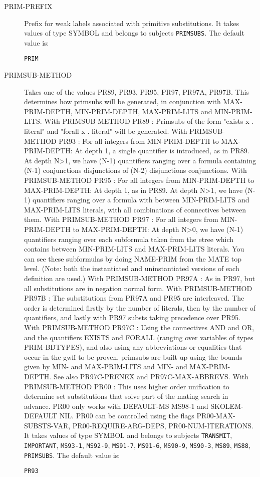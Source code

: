\begin{description}
\item[PRIM-PREFIX]  
Prefix for weak labels associated with primitive substitutions.
It takes values of type SYMBOL and belongs to subjects \texttt{PRIMSUBS}.  The default value is: \begin{lstlisting}
PRIM
\end{lstlisting}

\item[PRIMSUB-METHOD]  
Takes one of the values PR89, PR93, PR95, PR97, PR97A, PR97B.
This determines how primsubs will be generated, in 
conjunction with MAX-PRIM-DEPTH, MIN-PRIM-DEPTH, 
MAX-PRIM-LITS and MIN-PRIM-LITS.
With PRIMSUB-METHOD PR89 : 
 Primsubs of the form "exists x . literal" and 
 "forall x . literal" will be generated.
With PRIMSUB-METHOD PR93 :
 For all integers from MIN-PRIM-DEPTH to MAX-PRIM-DEPTH:
  At depth 1, a single quantifier is introduced, as in PR89. 
  At depth N>1, we have (N-1) quantifiers ranging over a formula
  containing (N-1) conjunctions {disjunctions} of (N-2) 
  disjunctions {conjunctions}.
With PRIMSUB-METHOD PR95 :
 For all integers from MIN-PRIM-DEPTH to MAX-PRIM-DEPTH:
  At depth 1, as in PR89.
  At depth N>1, we have (N-1) quantifiers ranging over a formula
  with between MIN-PRIM-LITS and MAX-PRIM-LITS literals, with
  all combinations of connectives between them.
With PRIMSUB-METHOD PR97 :
 For all integers from MIN-PRIM-DEPTH to MAX-PRIM-DEPTH:
  At depth N>0, we have (N-1) quantifiers ranging over each 
  subformula taken from the etree which contains between 
  MIN-PRIM-LITS and MAX-PRIM-LITS literals. You can see these
 subformulas by doing NAME-PRIM from the MATE top level. (Note:
 both the instantiated and uninstantiated versions of each 
 definition are used.)
With PRIMSUB-METHOD PR97A :
 As in PR97, but all substitutions are in negation normal form.
With PRIMSUB-METHOD PR97B :
 The substitutions from PR97A and PR95 are interleaved. The order
 is determined firstly by the number of literals, then by the number of
 quantifiers, and lastly with PR97 substs taking precedence over PR95.
With PRIMSUB-METHOD PR97C :
 Using the connectives AND and OR, and the quantifiers EXISTS and
 FORALL (ranging over variables of types PRIM-BDTYPES), and also using
 any abbreviations or equalities that occur in the gwff to be proven, 
 primsubs are built up using the bounds given by MIN- and MAX-PRIM-LITS
 and MIN- and MAX-PRIM-DEPTH. See also PR97C-PRENEX and PR97C-MAX-ABBREVS.
With PRIMSUB-METHOD PR00  :
 This uses higher order unification to determine set substitutions
 that solve part of the mating search in advance.  PR00 only works with 
 DEFAULT-MS MS98-1 and SKOLEM-DEFAULT NIL. PR00 can be controlled using the flags
 PR00-MAX-SUBSTS-VAR, PR00-REQUIRE-ARG-DEPS, PR00-NUM-ITERATIONS.
It takes values of type SYMBOL and belongs to subjects \texttt{TRANSMIT}, \texttt{IMPORTANT}, \texttt{MS93-1}, \texttt{MS92-9}, \texttt{MS91-7}, \texttt{MS91-6}, \texttt{MS90-9}, \texttt{MS90-3}, \texttt{MS89}, \texttt{MS88}, \texttt{PRIMSUBS}.  The default value is: \begin{lstlisting}
PR93
\end{lstlisting}


\end{description}
